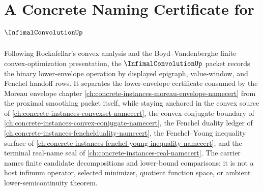 \chapter{A Concrete Naming Certificate for $\InfimalConvolutionUp$}
\label{ch:concrete-instances-infimal-convolution-namecert}

Following Rockafellar's convex analysis and the Boyd--Vandenberghe finite convex-optimization presentation, the $\InfimalConvolutionUp$ packet records the binary lower-envelope operation by displayed epigraph, value-window, and Fenchel handoff rows. It separates the lower-envelope certificate consumed by the Moreau envelope chapter \autoref{ch:concrete-instances-moreau-envelope-namecert} from the proximal smoothing packet itself, while staying anchored in the convex source of \autoref{ch:concrete-instances-convexset-namecert}, the convex-conjugate boundary of \autoref{ch:concrete-instances-convex-conjugate-namecert}, the Fenchel duality ledger of \autoref{ch:concrete-instances-fenchelduality-namecert}, the Fenchel--Young inequality surface of \autoref{ch:concrete-instances-fenchel-young-inequality-namecert}, and the terminal real-name seal of \autoref{ch:concrete-instances-real-namecert}. The carrier names finite candidate decompositions and lower-bound comparisons; it is not a host infimum operator, selected minimizer, quotient function space, or ambient lower-semicontinuity theorem.

